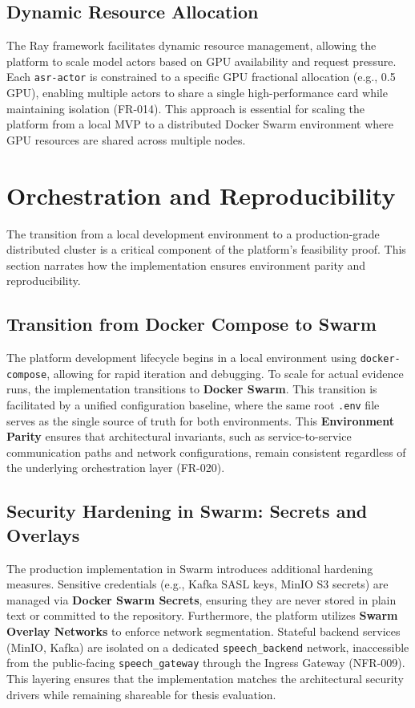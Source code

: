 \subsection{Dynamic Resource Allocation}
The Ray framework facilitates dynamic resource management, allowing the platform to scale model actors based on GPU availability and request pressure. Each \texttt{asr-actor} is constrained to a specific GPU fractional allocation (e.g., 0.5 GPU), enabling multiple actors to share a single high-performance card while maintaining isolation (FR-014). This approach is essential for scaling the platform from a local MVP to a distributed Docker Swarm environment where GPU resources are shared across multiple nodes.

\section{Orchestration and Reproducibility}
\label{sec:impl_reproducibility}

The transition from a local development environment to a production-grade distributed cluster is a critical component of the platform's feasibility proof. This section narrates how the implementation ensures environment parity and reproducibility.

\subsection{Transition from Docker Compose to Swarm}
The platform development lifecycle begins in a local environment using \texttt{docker-compose}, allowing for rapid iteration and debugging. To scale for actual evidence runs, the implementation transitions to \textbf{Docker Swarm}. This transition is facilitated by a unified configuration baseline, where the same root \texttt{.env} file serves as the single source of truth for both environments. This \textbf{Environment Parity} ensures that architectural invariants, such as service-to-service communication paths and network configurations, remain consistent regardless of the underlying orchestration layer (FR-020).

\subsection{Security Hardening in Swarm: Secrets and Overlays}
The production implementation in Swarm introduces additional hardening measures. Sensitive credentials (e.g., Kafka SASL keys, MinIO S3 secrets) are managed via \textbf{Docker Swarm Secrets}, ensuring they are never stored in plain text or committed to the repository. Furthermore, the platform utilizes \textbf{Swarm Overlay Networks} to enforce network segmentation. Stateful backend services (MinIO, Kafka) are isolated on a dedicated \texttt{speech\_backend} network, inaccessible from the public-facing \texttt{speech\_gateway} through the Ingress Gateway (NFR-009). This layering ensures that the implementation matches the architectural security drivers while remaining shareable for thesis evaluation.


